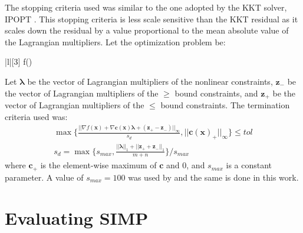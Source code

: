   The stopping criteria used was similar to the one adopted by the KKT solver, IPOPT \citep{Wachter2006}. This stopping criteria is less scale sensitive than the KKT residual as it scales down the residual by a value proportional to the mean absolute value of the Lagrangian multipliers. Let the optimization problem be:
      \begin{mini!}|l|[3]
        {}{f()}{}{}
      \end{mini!}
  Let $\bm{\lambda}$ be the vector of Lagrangian multipliers of the nonlinear constraints, $\bm{z}_-$ be the vector of Lagrangian multipliers of the $\geq$ bound constraints, and $\bm{z}_+$ be the vector of Lagrangian multipliers of the $\leq$ bound constraints. The termination criteria used was:
    \begin{align}
      \max\Biggl\{\frac{||\nabla f(\bm{x}) + \nabla \bm{c}(\bm{x}) \bm{\lambda} + (\bm{z_+} - \bm{z_-})||_\infty}{s_d}, ||\bm{c}(\bm{x})_+||_\infty \Biggr\} \leq tol \\
      s_d = \max\Biggl\{s_{max}, \frac{||\bm{\lambda}||_1 + ||\bm{z_+} + \bm{z_-}||_1}{m + n} \Biggr\} / s_{max}
    \end{align}
  where $\bm{c}_+$ is the element-wise maximum of $\bm{c}$ and 0, and $s_{max}$ is a constant parameter. A value of $s_{max} = 100$ was used by \cite{Wachter2006} and the same is done in this work.

\section{Evaluating SIMP} \label{sec:evaluating_simp}

